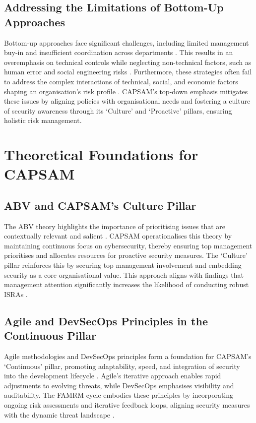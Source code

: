     \subsection{Addressing the Limitations of Bottom-Up Approaches}
    Bottom-up approaches face significant challenges, including limited management buy-in and insufficient coordination across departments \citep{shaikh2023information}. This results in an overemphasis on technical controls while neglecting non-technical factors, such as human error and social engineering risks \citep{shedden2010information}. Furthermore, these strategies often fail to address the complex interactions of technical, social, and economic factors shaping an organisation's risk profile \citep{cai2017cybersecurity}. CAPSAM's top-down emphasis mitigates these issues by aligning policies with organisational needs and fostering a culture of security awareness through its `Culture' and `Proactive' pillars, ensuring holistic risk management.
    
\section{Theoretical Foundations for CAPSAM}    
    \subsection{ABV and CAPSAM's Culture Pillar}
    The ABV theory highlights the importance of prioritising issues that are contextually relevant and salient \citep{shaikh2023information}. CAPSAM operationalises this theory by maintaining continuous focus on cybersecurity, thereby ensuring top management prioritises and allocates resources for proactive security measures. The `Culture' pillar reinforces this by securing top management involvement and embedding security as a core organisational value. This approach aligns with findings that management attention significantly increases the likelihood of conducting robust ISRAs \citep{shaikh2023information}.
    
    \subsection{Agile and DevSecOps Principles in the Continuous Pillar}
    Agile methodologies and DevSecOps principles form a foundation for CAPSAM's `Continuous' pillar, promoting adaptability, speed, and integration of security into the development lifecycle \citep{ibm2021devsecops, dingsoyr2012agile}. Agile's iterative approach enables rapid adjustments to evolving threats, while DevSecOps emphasises visibility and auditability. The FAMRM cycle embodies these principles by incorporating ongoing risk assessments and iterative feedback loops, aligning security measures with the dynamic threat landscape \citep{ibm2021devsecops}.
    
